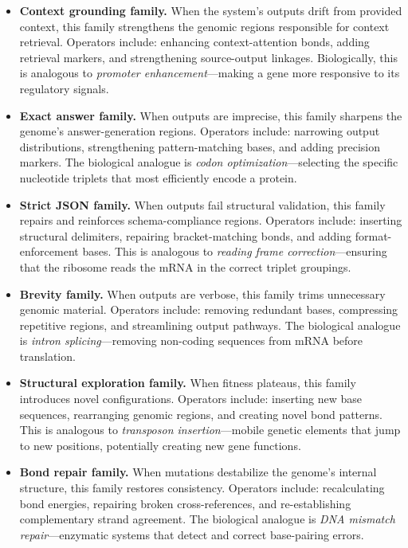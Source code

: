 \begin{itemize}[leftmargin=1.5em]
  \item \textbf{Context grounding family.} When the system's outputs drift from provided context, this family strengthens the genomic regions responsible for context retrieval. Operators include: enhancing context-attention bonds, adding retrieval markers, and strengthening source-output linkages. Biologically, this is analogous to \emph{promoter enhancement}---making a gene more responsive to its regulatory signals.

  \item \textbf{Exact answer family.} When outputs are imprecise, this family sharpens the genome's answer-generation regions. Operators include: narrowing output distributions, strengthening pattern-matching bases, and adding precision markers. The biological analogue is \emph{codon optimization}---selecting the specific nucleotide triplets that most efficiently encode a protein.

  \item \textbf{Strict JSON family.} When outputs fail structural validation, this family repairs and reinforces schema-compliance regions. Operators include: inserting structural delimiters, repairing bracket-matching bonds, and adding format-enforcement bases. This is analogous to \emph{reading frame correction}---ensuring that the ribosome reads the mRNA in the correct triplet groupings.

  \item \textbf{Brevity family.} When outputs are verbose, this family trims unnecessary genomic material. Operators include: removing redundant bases, compressing repetitive regions, and streamlining output pathways. The biological analogue is \emph{intron splicing}---removing non-coding sequences from mRNA before translation.

  \item \textbf{Structural exploration family.} When fitness plateaus, this family introduces novel configurations. Operators include: inserting new base sequences, rearranging genomic regions, and creating novel bond patterns. This is analogous to \emph{transposon insertion}---mobile genetic elements that jump to new positions, potentially creating new gene functions.

  \item \textbf{Bond repair family.} When mutations destabilize the genome's internal structure, this family restores consistency. Operators include: recalculating bond energies, repairing broken cross-references, and re-establishing complementary strand agreement. The biological analogue is \emph{DNA mismatch repair}---enzymatic systems that detect and correct base-pairing errors.
\end{itemize}

